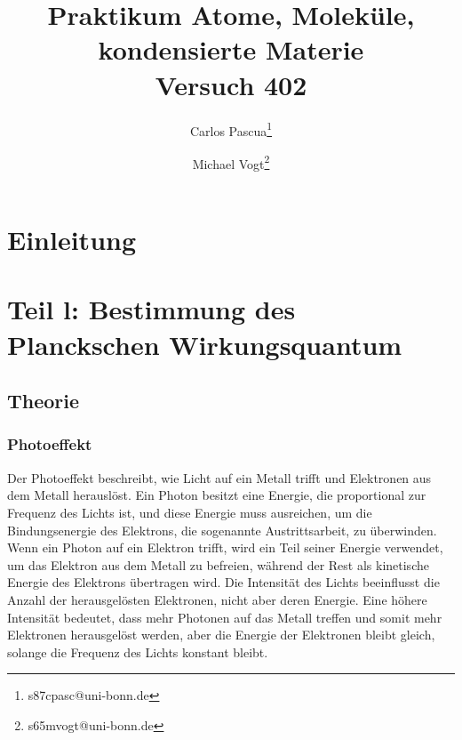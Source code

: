 \documentclass{article}
\title{Praktikum Atome, Moleküle, kondensierte Materie \\ Versuch 402}
\author[1]{Carlos Pascua\thanks{s87cpasc@uni-bonn.de}}
\author[1]{Michael Vogt\thanks{s65mvogt@uni-bonn.de}}
\affil[1]{Uni Bonn}
\begin{document}
\maketitle
\tableofcontents
\newpage
{}

\pagestyle{fancy}
\fancyhead[R]{\thepage}
\fancyhead[L]{\leftmark}

\section*{Einleitung}


\section{Teil l: Bestimmung des Planckschen Wirkungsquantum}
  \subsection{Theorie}

    \subsubsection{Photoeffekt}
    Der Photoeffekt beschreibt, wie Licht auf ein Metall trifft und Elektronen aus dem Metall
     herauslöst. Ein Photon besitzt eine Energie, die proportional zur Frequenz des Lichts ist, 
     und diese Energie muss ausreichen, um die Bindungsenergie des Elektrons, die sogenannte 
     Austrittsarbeit, zu überwinden. Wenn ein Photon auf ein Elektron trifft, wird ein Teil 
     seiner Energie verwendet, um das Elektron aus dem Metall zu befreien, während der Rest 
     als kinetische Energie des Elektrons übertragen wird. Die Intensität des
       Lichts beeinflusst die Anzahl der herausgelösten Elektronen, nicht aber deren Energie.
       Eine höhere Intensität bedeutet, dass mehr Photonen auf das Metall treffen und somit 
       mehr Elektronen herausgelöst werden, aber die Energie der Elektronen bleibt gleich, 
       solange die Frequenz des Lichts konstant bleibt.
       
\end{document}
